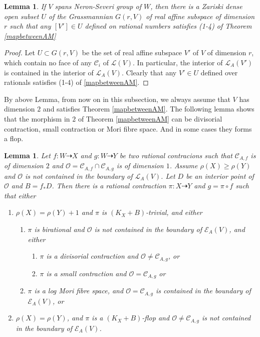 \documentclass{article}
\newtheorem{lem}[defn]{Lemma}
\begin{document}
\begin{lem}\label{subspace}
  \cite[Corollary 3.4]{haconSarkisovProgram2012}If $V$ spans  Neron-Severi group of $W$, then there is a Zariski dense open subset $U$ of the Grassmannian $G(r,V)$ of real affine subspace of dimension $r$ such that any  $[V']\in U$ defined on rational numbers satisfies (1-4) of Theorem \ref{mapbetweenAM} 
\end{lem}
\begin{proof}
 Let $U \subset G(r,V) $ be the set of real affine subspace  $V'$ of $V$ of dimension $r$, which contain no face of any $\mathcal{C}_{i}$ of $\mathcal{L}(V)$. In particular, the interior of  $\mathcal{L}_{A}(V')$ is contained in the interior of $\mathcal{L}_{A}(V)$. Clearly that any $V'\in U$ defined over rationals satisfies (1-4) of \ref{mapbetweenAM}. 
\end{proof}
By above Lemma, from now on in this subsection, we always assume that $V$ has dimension $2$ and satisfies Theorem \ref{mapbetweenAM}. The following lemma shows that the morphism in $2$ of Theorem \ref{mapbetweenAM} can be divisorial contraction, small contraction or Mori fibre space. And in some cases they forms a flop.
\begin{lem}\label{mapbetweenAM2}
\cite[Lemma 3.5]{haconSarkisovProgram2011} Let $ f:W\dashrightarrow X $ and $ g:W\dashrightarrow  Y $ be two rational contracions such that $ \mathcal{C}_{A,f} $ is of dimension $ 2 $ and $ \mathcal{O}=\mathcal{C}_{A,f}\cap \mathcal{C}_{A,g} $ is of dimension $ 1 $. Assume $ \rho(X)\geqslant \rho(Y) $ and $ \mathcal{O} $ is not contained in the boundary of $ \mathcal{L}_{A}(V) $. Let $ D $ be an interior point of $ \mathcal{O} $ and $ B=f_*D $. Then there is a rational contraction $ \pi:X\dashrightarrow Y $ and $ g=\pi\circ f $ such that either
\begin{enumerate}
  \item $ \rho(X)=\rho(Y)+1 $ and $ \pi  $ is $ (K_X+B) $-trivial, and either
  \begin{enumerate}
    \item $ \pi $ is birational and $ \mathcal{O} $ is not contained in the boundary of $ \mathcal{E}_A(V) $, and either
    \begin{enumerate}
      \item $ \pi $ is a divisorial contraction and $ \mathcal{O}\neq \mathcal{C}_{A,g} $, or
      \item $ \pi $ is a small contraction and $ \mathcal{O}= \mathcal{C}_{A,g} $ or
    \end{enumerate}
    \item $ \pi $ is a log Mori fibre space, and $ \mathcal{O}=\mathcal{C}_{A,g} $ is contained in the boundary of $ \mathcal{E}_{A}(V) $, or
  \end{enumerate}
  \item $ \rho(X)=\rho(Y) $, and $ \pi $ is  a $ (K_X+B) $-flop and $ \mathcal{O}\neq\mathcal{C}_{A,g} $ is not contained in the boundary of $ \mathcal{E}_A(V) $.
  \end{enumerate}
\end{lem}
\end{document}
